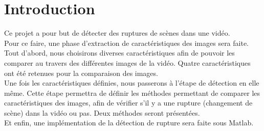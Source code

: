 \chapter{Introduction}

Ce projet a pour but de détecter des ruptures de scènes dans une vidéo.\\

Pour ce faire, une phase d'extraction de caractéristiques des images sera faite. Tout d'abord, nous choisirons diverses caractéristiques afin de pouvoir les comparer au travers des différentes images de la vidéo. Quatre caractéristiques ont été retenues pour la comparaison des images.\\

Une fois les caractéristiques définies, nous passerons à l'étape de détection en elle même. Cette étape permettra de définir les méthodes permettant de comparer les caractéristiques des images, afin de vérifier s'il y a une rupture (changement de scène) dans la vidéo ou pas. Deux méthodes seront présentées.\\

Et enfin, une implémentation de la détection de rupture sera faite sous Matlab.